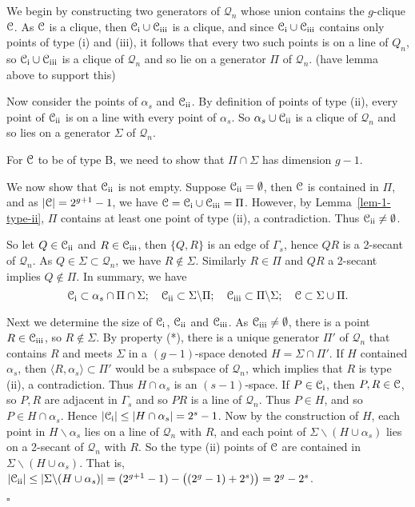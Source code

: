 \documentclass[12pt]{article}
\newenvironment{proof}{\noindent{\bf Proof}\hspace{0.5em}}
    { \null  \hfill $\square$ \par}
\newcommand\C{{\cal C}}
\newcommand{\Q}{\mathscr Q}
\renewcommand\setminus{\backslash}
\newcommand\red[1]{{\color{red} #1}}
\newcommand{\setX}{{\mathcal C}_{{\rm\romannumeral 1}}}
\newcommand{\setY}{{\mathcal C}_{{\rm\romannumeral 2}}}
\newcommand{\setZ}{{\mathcal C}_{{\rm\romannumeral 3}}}
\begin{document}
\begin{proof}
\red{
We begin by  constructing two generators of $\Q_n$ whose union contains the $g$-clique $\C$. 
As $\C$ is a clique,  then $\setX\cup\setZ$ is a clique, and since $\setX\cup\setZ$ contains only points of type (i) and (iii), it follows that every two such points is on a line of $Q_n$, so $\setX\cup\setZ$ is a clique of $\Q_n$ and so lie on a generator $\Pi$ of $\Q_n$. (have lemma above to support this)

Now consider the points of $\alpha_s$ and $\setY$.  By definition of points of type (ii), every point of $\setY$ is on a line with every point of $\alpha_s$.  So $\alpha_s\cup\setY$ is a clique of $\Q_n$ and so lies on a generator $\Sigma$ of $\Q_n$.

For $\C$ to be of type B, we need to show that $\Pi\cap\Sigma$ has dimension $g-1$.

 
We now show that $\setY$ is not empty. Suppose $\setY=\emptyset$, then 
$\C$ is contained in $\Pi$, and as $|\C|=2^{g+1}-1$, 
we have  $\C=\setX\cup\setZ=\Pi$.  However, by Lemma~\ref{lem-1-type-ii}, $\Pi$ contains at least one point of type (ii), a contradiction.  Thus $\setY\ne\emptyset$.


So let $Q\in\setY$ and $R\in\setZ$, then $\{Q,R\}$ is an edge of $\Gamma_s$, hence $QR$ is a 2-secant of $\Q_n$. As $Q\in\Sigma\subset\Q_n$, we have $R\notin\Sigma$. Similarly $R\in\Pi$ and $QR$ a 2-secant implies $Q\notin\Pi$. 
 In summary,  we have 
 $$\setX\subset\alpha_s\cap\Pi\cap\Sigma;\quad \setY\subset \Sigma\setminus\Pi; \quad \setZ\subset\Pi\setminus\Sigma;\quad  
  \C\subset\Sigma \cup \Pi.$$


  
Next we determine the size of $\setX$, $\setY$ and $\setZ$. 
As $\setZ\neq\emptyset$, there is a point $R\in\setZ$, so $R\notin\Sigma$. By property (*),  there is a unique generator $\Pi'$ of $\Q_n$ that contains $R$ and meets $\Sigma$ in a $(g-1)$-space denoted  $H=\Sigma\cap\Pi'$. 
If $H$ contained $\alpha_s$, then $\langle R,\alpha_s\rangle\subset\Pi'$ would be a subspace of $\Q_n$, which implies that $R$ is type (ii), a contradiction. Thus $H\cap\alpha_s$ is an $(s-1)$-space. 
If $P\in\setX$, then $P,R\in\C$, so $P,R$ are adjacent in $\Gamma_s$ and so $PR$ is a line of $\Q_n$. Thus $P\in H$, and so $P\in H\cap\alpha_s$. Hence
 $|\setX|\leq |H\cap\alpha_s|=2^s-1$.  Now by the construction of $H$, each point in $H\setminus\alpha_s$ lies on a line of $\Q_n$ with $R$, and each point of $\Sigma\setminus(H\cup\alpha_s)$ lies on a 2-secant of $\Q_n$ with $R$. So the type (ii) points of $\C$ are contained in $ \Sigma\setminus(H\cup\alpha_s)$. That is, $|\setY|\leq|\Sigma\setminus(H\cup\alpha_s)|=(2^{g+1}-1)-\big((2^g-1)+2^s)\big)=2^g-2^s$.
 
}
\end{proof}
\end{document}
